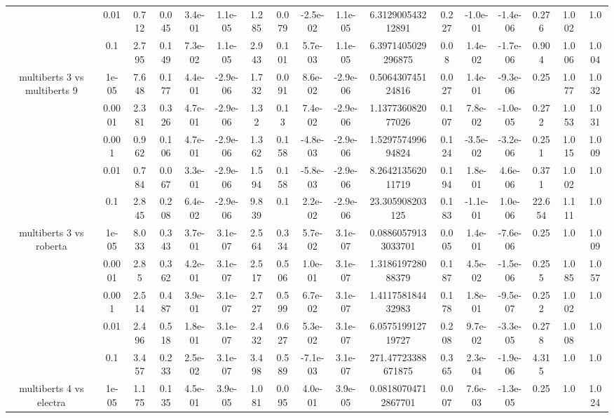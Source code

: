 \begin{tabular}{|c|c|c|c|c|c|c|c|c|c|c|c|c|c|c|c|c|}
 & 0.01 & 0.712 & 0.045 & 3.4e-01 & 1.1e-05 & 1.285 & 0.079 & -2.5e-02 & 1.1e-05 & 6.312900543212891 & 0.227 & -1.0e-01 & -1.4e-06 & 0.276 & 1.002 & 1.0 \\
 & 0.1 & 2.795 & 0.149 & 7.3e-02 & 1.1e-05 & 2.943 & 0.101 & 5.7e-03 & 1.1e-05 & 6.3971405029296875 & 0.08 & 1.4e-02 & -1.7e-06 & 0.904 & 1.006 & 1.004 \\
\hline
\multirow{5}{*}{multiberts 3 vs multiberts 9} & 1e-05 & 7.648 & 0.177 & 4.4e-01 & -2.9e-06 & 1.732 & 0.091 & 8.6e-02 & -2.9e-06 & 0.506430745124816 & 0.027 & 1.4e-01 & -9.3e-06 & 0.25 & 1.077 & 1.032 \\
 & 0.0001 & 2.381 & 0.326 & 4.7e-01 & -2.9e-06 & 1.32 & 0.13 & 7.4e-02 & -2.9e-06 & 1.137736082077026 & 0.107 & 7.8e-02 & -1.0e-05 & 0.272 & 1.053 & 1.031 \\
 & 0.001 & 0.962 & 0.106 & 4.7e-01 & -2.9e-06 & 1.362 & 0.158 & -4.8e-03 & -2.9e-06 & 1.529757499694824 & 0.124 & -3.5e-02 & -3.2e-06 & 0.251 & 1.015 & 1.009 \\
 & 0.01 & 0.784 & 0.067 & 3.3e-01 & -2.9e-06 & 1.594 & 0.158 & -5.8e-03 & -2.9e-06 & 8.264213562011719 & 0.194 & 1.8e-01 & 4.6e-06 & 0.371 & 1.002 & 1.0 \\
 & 0.1 & 2.845 & 0.208 & 6.4e-02 & -2.9e-06 & 9.839 & 0.1 & 2.2e-02 & -2.9e-06 & 23.305908203125 & 0.183 & -1.1e-01 & 1.0e-06 & 22.654 & 1.111 & 1.0 \\
\hline
\multirow{5}{*}{multiberts 3 vs roberta } & 1e-05 & 8.033 & 0.343 & 3.7e-01 & 3.1e-07 & 2.564 & 0.334 & 5.7e-02 & 3.1e-07 & 0.08860579133033701 & 0.005 & 1.4e-01 & -7.6e-06 & 0.25 & 1.0 & 1.009 \\
 & 0.0001 & 2.85 & 0.362 & 4.2e-01 & 3.1e-07 & 2.517 & 0.506 & 1.0e-01 & 3.1e-07 & 1.318619728088379 & 0.187 & 4.5e-02 & -1.5e-06 & 0.255 & 1.085 & 1.057 \\
 & 0.001 & 2.514 & 0.487 & 3.9e-01 & 3.1e-07 & 2.727 & 0.599 & 6.7e-02 & 3.1e-07 & 1.411758184432983 & 0.178 & 1.8e-01 & -9.5e-07 & 0.252 & 1.002 & 1.0 \\
 & 0.01 & 2.496 & 0.518 & 1.8e-01 & 3.1e-07 & 2.432 & 0.627 & 5.3e-02 & 3.1e-07 & 6.057519912719727 & 0.208 & 9.7e-02 & -3.3e-05 & 0.278 & 1.008 & 1.0 \\
 & 0.1 & 3.457 & 0.233 & 2.5e-02 & 3.1e-07 & 3.498 & 0.589 & -7.1e-03 & 3.1e-07 & 271.47723388671875 & 0.365 & 2.3e-04 & -1.9e-06 & 4.315 & 1.0 & 1.0 \\
\hline
\multirow{5}{*}{multiberts 4 vs electra } & 1e-05 & 1.175 & 0.135 & 4.5e-01 & 3.9e-05 & 1.081 & 0.095 & 4.0e-01 & 3.9e-05 & 0.08180704712867701 & 0.007 & 7.6e-03 & -1.3e-05 & 0.25 & 1.0 & 1.024 \\

\end{tabular}

